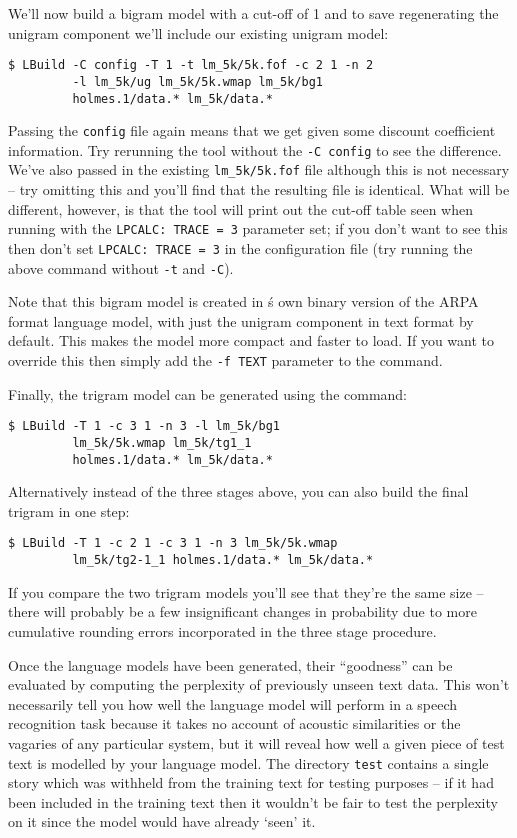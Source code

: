 We'll now build a bigram model with a cut-off of 1 and to save
regenerating the unigram component we'll include our existing unigram model:
\begin{verbatim}
$ LBuild -C config -T 1 -t lm_5k/5k.fof -c 2 1 -n 2
         -l lm_5k/ug lm_5k/5k.wmap lm_5k/bg1 
         holmes.1/data.* lm_5k/data.*
\end{verbatim} %
Passing the {\tt config} file again means that we get given some
discount coefficient information.  Try rerunning the tool without the
{\tt -C config} to see the difference.  We've also passed in the
existing {\tt lm\_5k/5k.fof} file although this is not necessary --
try omitting this and you'll find that the resulting file is
identical.  What will be different, however, is that the tool will
print out the cut-off table seen when running  with the
{\tt LPCALC: TRACE = 3} parameter set; if you don't want to see this
then don't set {\tt LPCALC: TRACE = 3} in the configuration file (try
running the above command without {\tt -t} and {\tt -C}).

Note that this bigram model is created in \HTK\'s own binary version
of the ARPA format language model, with just the unigram component in
text format by default.  This makes the model more compact and faster
to load.  If you want to override this then simply add the {\tt -f
TEXT} parameter to the command.

Finally, the trigram model can be generated using the command:
\begin{verbatim}
$ LBuild -T 1 -c 3 1 -n 3 -l lm_5k/bg1
         lm_5k/5k.wmap lm_5k/tg1_1  
         holmes.1/data.* lm_5k/data.*
\end{verbatim} %

Alternatively instead of the three stages above, you can also build
the final trigram in one step:
\begin{verbatim}
$ LBuild -T 1 -c 2 1 -c 3 1 -n 3 lm_5k/5k.wmap
         lm_5k/tg2-1_1 holmes.1/data.* lm_5k/data.*
\end{verbatim} %
If you compare the two trigram models you'll see that they're the same
size -- there will probably be a few insignificant changes in
probability due to more cumulative rounding errors incorporated in the
three stage procedure.


Once the language models have been generated, their ``goodness'' can
be evaluated by computing the perplexity of previously unseen text
data.  This won't necessarily tell you how well the language model
will perform in a speech recognition task because it takes no account
of acoustic similarities or the vagaries of any particular system, but
it will reveal how well a given piece of test text is modelled by your
language model.  The directory \texttt{test} contains a single story
which was withheld from the training text for testing purposes -- if
it had been included in the training text then it wouldn't be fair to
test the perplexity on it since the model would have already `seen' it.

